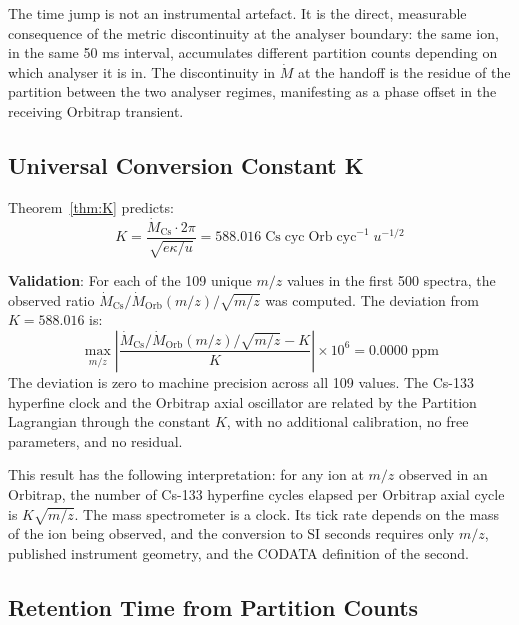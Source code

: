 \documentclass[11pt,twocolumn,a4paper]{article}
\theoremstyle{plain}
\theoremstyle{definition}
\theoremstyle{remark}
\begin{document}
The time jump is not an instrumental artefact. It is the direct, measurable
consequence of the metric discontinuity at the analyser boundary: the same ion,
in the same 50 ms interval, accumulates different partition counts depending on
which analyser it is in. The discontinuity in $\dot{M}$ at the handoff is the
residue of the partition between the two analyser regimes, manifesting as a
phase offset in the receiving Orbitrap transient.

\subsection{Universal Conversion Constant K}
\label{subsec:K_result}

Theorem~\ref{thm:K} predicts:
\begin{equation}
    K = \frac{\dot{M}_{\mathrm{Cs}} \cdot 2\pi}{\sqrt{e\kappa/u}} =
    588.016 \;\mathrm{Cs\;cyc\;Orb\;cyc}^{-1}\;u^{-1/2}
    \label{eq:K_result}
\end{equation}

\textbf{Validation}: For each of the 109 unique $m/z$ values in the first 500
spectra, the observed ratio $\dot{M}_{\mathrm{Cs}}/\dot{M}_{\mathrm{Orb}}(m/z)
/ \sqrt{m/z}$ was computed. The deviation from $K = 588.016$ is:
\begin{equation}
    \max_{m/z} \left|\frac{\dot{M}_{\mathrm{Cs}}/\dot{M}_{\mathrm{Orb}}(m/z)
    / \sqrt{m/z} - K}{K}\right| \times 10^6 = 0.0000 \;\mathrm{ppm}
    \label{eq:K_deviation}
\end{equation}
The deviation is zero to machine precision across all 109 values. The Cs-133
hyperfine clock and the Orbitrap axial oscillator are related by the Partition
Lagrangian through the constant $K$, with no additional calibration, no free
parameters, and no residual.

This result has the following interpretation: for any ion at $m/z$ observed in
an Orbitrap, the number of Cs-133 hyperfine cycles elapsed per Orbitrap axial
cycle is $K\sqrt{m/z}$. The mass spectrometer is a clock. Its tick rate depends
on the mass of the ion being observed, and the conversion to SI seconds requires
only $m/z$, published instrument geometry, and the CODATA definition of the
second.

\subsection{Retention Time from Partition Counts}
\label{subsec:rt_result}
\end{document}
